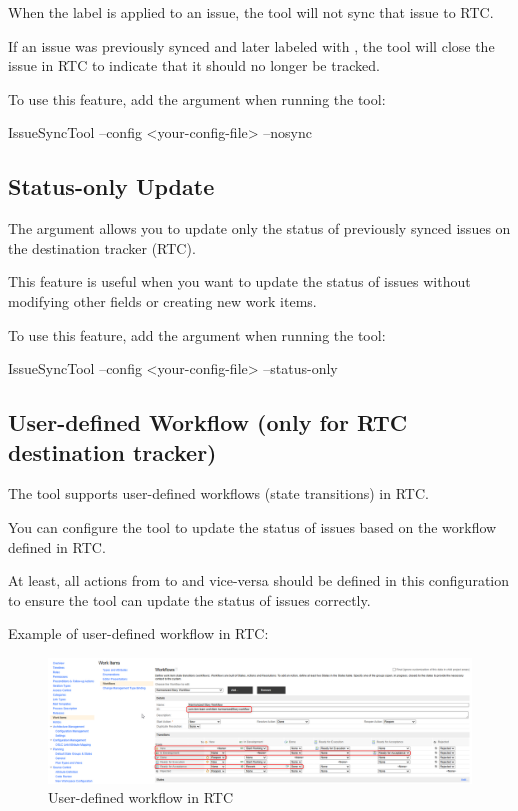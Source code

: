When the  label is applied to an issue, the tool will not sync that
issue to RTC.

If an issue was previously synced and later labeled with , the tool
will close the issue in RTC to indicate that it should no longer be tracked.

To use this feature, add the  argument when running the tool:

\begin{pythonlog}
IssueSyncTool --config <your-config-file> --nosync
\end{pythonlog}

\subsection{Status-only Update}
The  argument allows you to update only the status of
previously synced issues on the destination tracker (RTC).

This feature is useful when you want to update the status of issues without
modifying other fields or creating new work items.

To use this feature, add the  argument when running the tool:

\begin{pythonlog}
IssueSyncTool --config <your-config-file> --status-only
\end{pythonlog}

\newpage
\subsection{User-defined Workflow (only for RTC destination tracker)}
The tool supports user-defined workflows (state transitions) in RTC.

You can configure the tool to update the status of issues based on the workflow
defined in RTC.

At least, all actions from  to  and vice-versa should be
defined in this configuration to ensure the tool can update the status of issues
correctly.

Example of user-defined workflow in RTC:

\begin{figure}[h!]
   \includegraphics[width=1\linewidth]{./pictures/user-defined-workflow.png}
   \caption{User-defined workflow in RTC}
\end{figure}

